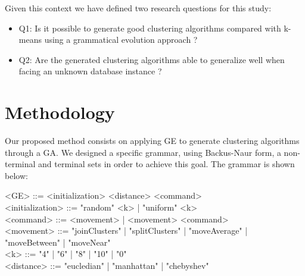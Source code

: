 \documentclass[journal]{IEEEtran}
\begin{document}
Given this context we have defined two research questions for this study:
\begin{itemize}
	\item Q1: Is it possible to generate good clustering algorithms
	compared with k-means using a grammatical evolution approach ? 
	\item Q2: Are the generated clustering algorithms able to generalize well when facing an unknown database instance ?
\end{itemize}

\section{Methodology} \label{sec:methodology}

Our proposed method consists on applying GE to generate clustering algorithms through a GA. We designed a specific grammar, using  Backus-Naur form, a non-terminal and terminal sets in order to achieve this goal. The grammar is shown below:

\begin{grammar}
	<GE> ::= <initialization> <distance> <command> 
	\\ <initialization> ::= "random" <k> | "uniform" <k>
	\\ <command> ::= <movement> | <movement> <command>
	\\ <movement> ::= "joinClusters" | "splitClusters" | "moveAverage" | "moveBetween" | "moveNear" 
	\\ <k> ::= "4" | "6" | "8" | "10" | "0"
	\\ <distance> ::= "eucledian" | "manhattan" | "chebyshev"
	\label{ge-clustering-grammar}
\end{grammar}
\end{document}
